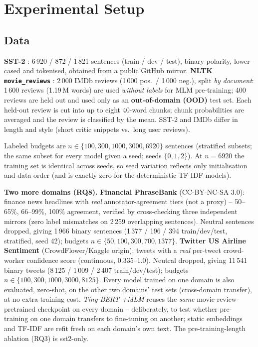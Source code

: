 \documentclass[11pt,a4paper]{article}
\begin{document}
\section{Experimental Setup}
\subsection{Data}
\textbf{SST-2} \cite{socher2013recursive}: 6\,920 / 872 / 1\,821 sentences (train / dev / test), binary polarity, lower-cased and tokenised, obtained from a public GitHub mirror.
\textbf{NLTK \texttt{movie\_reviews}} \cite{pang2004sentimental}: 2\,000 IMDb reviews (1\,000 pos.\ / 1\,000 neg.), split \emph{by document}:
1\,600 reviews (1.19\,M words) are used \emph{without labels} for MLM pre-training; 400 reviews are held out and used only as an \textbf{out-of-domain (OOD)} test set.
Each held-out review is cut into up to eight 40-word chunks; chunk probabilities are averaged and the review is classified by the mean.
SST-2 and IMDb differ in length and style (short critic snippets vs.\ long user reviews).

Labeled budgets are $n\in\{100,300,1000,3000,6920\}$ sentences (stratified subsets; the same subset for every model given a seed; seeds $\{0,1,2\}$).
At $n=6920$ the training set is identical across seeds, so seed variation reflects only initialisation and data order (and is exactly zero for the deterministic TF-IDF models).

\textbf{Two more domains (RQ8).} \textbf{Financial PhraseBank} \cite{malo2014good} (CC-BY-NC-SA 3.0): finance news headlines with \emph{real} annotator-agreement tiers (not a proxy) -- 50--65\%, 66--99\%, 100\% agreement, verified by cross-checking three independent mirrors (zero label mismatches on 2\,259 overlapping sentences). Neutral sentences dropped, giving 1\,966 binary sentences (1\,377 / 196 / 394 train/dev/test, stratified, seed 42); budgets $n\in\{50,100,300,700,1377\}$.
\textbf{Twitter US Airline Sentiment} (CrowdFlower/Kaggle origin): tweets with a \emph{real} per-tweet crowd-worker confidence score (continuous, 0.335--1.0). Neutral dropped, giving 11\,541 binary tweets (8\,125 / 1\,009 / 2\,407 train/dev/test); budgets $n\in\{100,300,1000,3000,8125\}$.
Every model trained on one domain is also evaluated, zero-shot, on the other two domains' test sets (cross-domain transfer), at no extra training cost. \emph{Tiny-BERT +MLM} reuses the \emph{same} movie-review-pretrained checkpoint on every domain -- deliberately, to test whether pre-training on one domain transfers to fine-tuning on another; static embeddings and TF-IDF are refit fresh on each domain's own text. The pre-training-length ablation (RQ3) is sst2-only.
\end{document}
